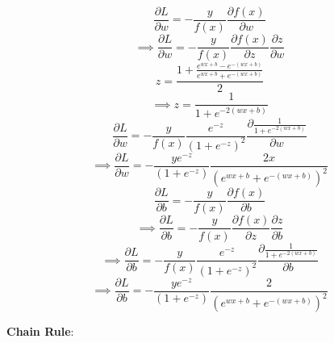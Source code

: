 \documentclass[solution,addpoints,12pt]{exam}
\begin{document}
\begin{questions}
\begin{parts}
              \begin{solution}
              \[\frac{\partial L}{\partial w} = -\frac{y}{f(x)} \frac{\partial f(x)}{\partial w}\]
              \[\implies \frac{\partial L}{\partial w} = -\frac{y}{f(x)} \frac{\partial f(x)}{\partial z} \frac{\partial z}{\partial w}\]
              \[z = \frac{1+\frac{e^{wx+b}-e^{-(wx+b)}}{e^{wx+b}+e^{-(wx+b)}}}{2}\]
              \[\implies z = \frac{1}{1+e^{-2(wx+b)}}\]
              \[\frac{\partial L}{\partial w} = -\frac{y}{f(x)} \frac{e^{-z}}{(1+e^{-z})^2} \frac{\partial \frac{1}{1+e^{-2(wx+b)}}}{\partial w}\]
              \[\implies \frac{\partial L}{\partial w} = -\frac{ye^{-z}}{(1+e^{-z})} \frac{2x}{(e^{wx+b}+e^{-(wx+b)})^2}\]
              \[\frac{\partial L}{\partial b} = -\frac{y}{f(x)} \frac{\partial f(x)}{\partial b}\]
              \[\implies \frac{\partial L}{\partial b} = -\frac{y}{f(x)} \frac{\partial f(x)}{\partial z} \frac{\partial z}{\partial b}\]
              \[\implies \frac{\partial L}{\partial b} = -\frac{y}{f(x)} \frac{e^{-z}}{(1+e^{-z})^2} \frac{\partial \frac{1}{1+e^{-2(wx+b)}}}{\partial b}\]
              \[\implies \frac{\partial L}{\partial b} = -\frac{ye^{-z}}{(1+e^{-z})} \frac{2}{(e^{wx+b}+e^{-(wx+b)})^2}\]
              \end{solution}

         \end{parts}  
         

\question 
\textbf{Chain Rule}:
    \begin{parts}

\end{parts}
\end{questions}
\end{document}
